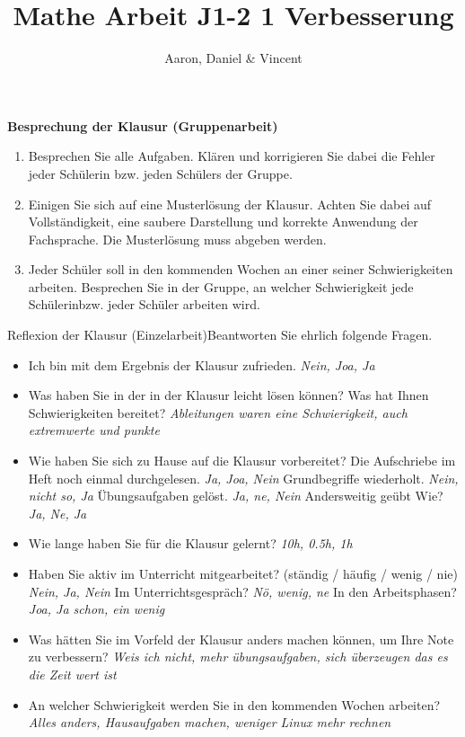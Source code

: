 \documentclass{article}
\author{Aaron, Daniel \& Vincent}
\title{Mathe Arbeit J1-2 1 Verbesserung}
\begin{document}
\maketitle

\textbf{Besprechung der Klausur (Gruppenarbeit)}

\begin{enumerate}
  \item Besprechen Sie alle Aufgaben. Klären und korrigieren Sie dabei die
    Fehler jeder Schülerin bzw. jeden Schülers der Gruppe.
  \item Einigen Sie sich auf eine Musterlösung der Klausur. Achten Sie dabei
    auf Vollständigkeit, eine saubere Darstellung und korrekte Anwendung der
    Fachsprache. Die Musterlösung muss abgeben werden.
  \item Jeder Schüler soll in den kommenden Wochen an einer seiner
    Schwierigkeiten arbeiten. Besprechen Sie in der Gruppe, an welcher
    Schwierigkeit jede Schülerinbzw. jeder Schüler arbeiten wird.
\end{enumerate}

Reflexion der Klausur (Einzelarbeit)Beantworten Sie ehrlich folgende Fragen.

\begin{itemize}
  \item Ich bin mit dem Ergebnis der Klausur zufrieden. 
    \subitem \textit{Nein, Joa, Ja}

  \item Was haben Sie in der in der Klausur leicht lösen können? Was hat Ihnen
    Schwierigkeiten bereitet?
    \subitem \textit{Ableitungen waren eine Schwierigkeit, auch extremwerte und punkte}

  \item Wie haben Sie sich zu Hause auf die Klausur vorbereitet?
    \subitem Die Aufschriebe im Heft noch einmal durchgelesen. \textit{Ja, Joa, Nein}
    \subitem Grundbegriffe wiederholt. \textit{Nein, nicht so, Ja}
    \subitem Übungsaufgaben gelöst. \textit{Ja, ne, Nein}
    \subitem Andersweitig ge\"ubt Wie? \textit{Ja, Ne, Ja}

  \item Wie lange haben Sie für die Klausur gelernt? \textit{10h, 0.5h, 1h}

  \item Haben Sie aktiv im Unterricht mitgearbeitet? (ständig / häufig / wenig / nie) \textit{Nein, Ja, Nein}
    \subitem Im Unterrichtsgespräch? \textit{N\"o, wenig, ne}
    \subitem In den Arbeitsphasen? \textit{Joa, Ja schon, ein wenig}

  \item Was hätten Sie im Vorfeld der Klausur anders machen können, um Ihre Note zu verbessern?
    \subitem \textit{Weis ich nicht, mehr \"ubungsaufgaben, sich \"uberzeugen das es die Zeit wert ist}

  \item An welcher Schwierigkeit werden Sie in den kommenden Wochen arbeiten?
    \subitem \textit{Alles anders, Hausaufgaben machen, weniger Linux mehr rechnen}
\end{itemize}
\end{document}
